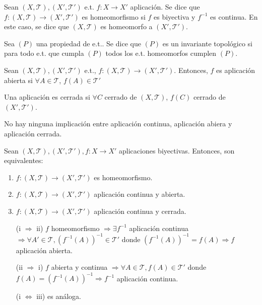 \begin{defn}
  Sean $( X, \mathcal{T} ), ( X', \mathcal{T}' )$ e.t. $f: X \to X'$ aplicación. Se dice que $f: ( X, \mathcal{T} ) \to ( X', \mathcal{T}' )$ es homeomorfismo si $f$ es biyectiva y $ f^{-1}$ es continua. En este caso, se dice que $( X, \mathcal{T} )$ es homeomorfo a $( X', \mathcal{T}' )$.
\end{defn}

\begin{defn}
  Sea $(P)$ una propiedad de e.t.. Se dice que $(P)$ es un invariante topológico si para todo e.t. que cumpla $(P)$ todos los e.t. homeomorfos cumplen $(P)$.
\end{defn}

\begin{defn}
  Sean $( X, \mathcal{T} ), ( X', \mathcal{T}' )$ e.t., $f: ( X, \mathcal{T} ) \to ( X', \mathcal{T}' )$. Entonces, $f$ es aplicación abierta si $\forall A \in \mathcal{T}$, $f(A) \in \mathcal{T}'$
\end{defn}

\begin{obs}
  Una aplicación es cerrada si $\forall C$ cerrado de $( X, \mathcal{T} )$, $f(C)$ cerrado de $( X', \mathcal{T}' )$.
\end{obs}

\begin{obs}
  No hay ninguna implicación entre aplicación continua, aplicación abiera y aplicación cerrada.
\end{obs}

\begin{prop}
  Sean $( X, \mathcal{T} ), ( X', \mathcal{T}' ), f: X \to X'$ aplicaciones biyectivas. Entonces, son equivalentes:
  \begin{enumerate}[label=(\roman*)]
    \item $f: ( X, \mathcal{T} ) \to ( X', \mathcal{T}' )$ es homeomorfismo.
    \item $f: ( X, \mathcal{T} ) \to ( X', \mathcal{T}' )$ aplicación continua y abierta.
    \item $f: ( X, \mathcal{T} ) \to ( X', \mathcal{T}' )$ aplicación continua y cerrada.
  \end{enumerate}
\end{prop}

\begin{dem}
  \begin{enumerate}[label=(\roman*)]
    \item []
    \item [(i $\Rightarrow$ ii)] $f$ homeomorfismo $\Rightarrow \exists f^{-1}$ aplicación continua $\Rightarrow \forall A' \in \mathcal{T}, (f^{-1}(A))^{-1} \in \mathcal{T}'$ donde $(f^{-1}(A))^{-1} = f(A) \Rightarrow f$ aplicación abierta.
    \item [(ii $\Rightarrow$ i)] $f$ abierta y continua $\Rightarrow \forall A \in \mathcal{T}, f(A) \in \mathcal{T}'$ donde $ f(A) = (f^{-1}(A))^{-1} \Rightarrow f^{-1}$ aplicación continua.
    \item [(i $ \Leftrightarrow$ iii)] es análoga.
  \end{enumerate}

\end{dem}

